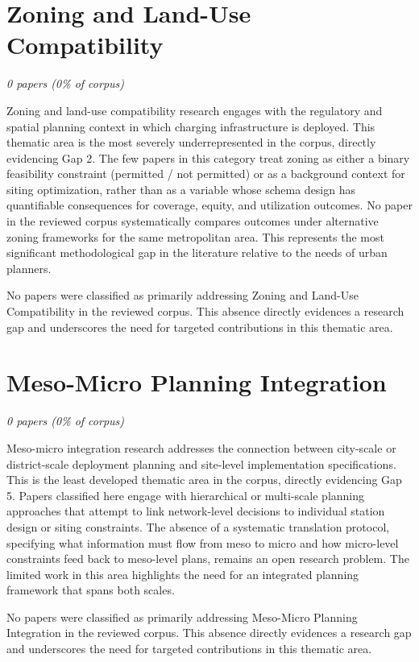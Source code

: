 \documentclass[letterpaper, 12pt, oneside, doublespacing]{Thesis}
\begin{document}
\section{Zoning and Land-Use Compatibility}

\textit{0 papers (0\% of corpus)}

Zoning and land-use compatibility research engages with the regulatory and spatial planning context in which charging infrastructure is deployed. This thematic area is the most severely underrepresented in the corpus, directly evidencing Gap 2. The few papers in this category treat zoning as either a binary feasibility constraint (permitted / not permitted) or as a background context for siting optimization, rather than as a variable whose schema design has quantifiable consequences for coverage, equity, and utilization outcomes. No paper in the reviewed corpus systematically compares outcomes under alternative zoning frameworks for the same metropolitan area. This represents the most significant methodological gap in the literature relative to the needs of urban planners.

No papers were classified as primarily addressing Zoning and Land-Use Compatibility in the reviewed corpus. This absence directly evidences a research gap and underscores the need for targeted contributions in this thematic area.

\section{Meso-Micro Planning Integration}

\textit{0 papers (0\% of corpus)}

Meso-micro integration research addresses the connection between city-scale or district-scale deployment planning and site-level implementation specifications. This is the least developed thematic area in the corpus, directly evidencing Gap 5. Papers classified here engage with hierarchical or multi-scale planning approaches that attempt to link network-level decisions to individual station design or siting constraints. The absence of a systematic translation protocol, specifying what information must flow from meso to micro and how micro-level constraints feed back to meso-level plans, remains an open research problem. The limited work in this area highlights the need for an integrated planning framework that spans both scales.

No papers were classified as primarily addressing Meso-Micro Planning Integration in the reviewed corpus. This absence directly evidences a research gap and underscores the need for targeted contributions in this thematic area.
\end{document}
